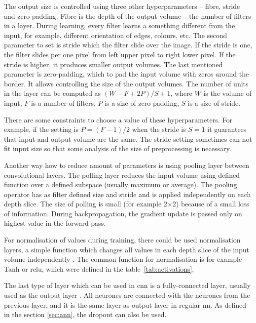 \documentclass[thesis=M,english]{FITthesis}[2012/10/20]
\begin{document}
The output size is controlled using three other hyperparameters -- fibre, stride and zero padding\cite{Johnson2017cnn}. Fibre is the depth of the output volume -- the number of filters in a layer. During learning, every filter learns a something different from the input, for example, different orientation of edges, colours, etc. The second parameter to set is stride which the filter slide over the image. If the stride is one, the filter slides per one pixel from left upper pixel to right lower pixel. If the stride is higher, it produces smaller output volumes. The last mentioned parameter is zero-padding, which to pad the input volume with zeros around the border. It allows controlling the size of the output volumes. The number of units in the layer can be computed as $(W-F+2P)/S+1$, where $W$ is the volume of input, $F$ is a number of filters, $P$ is a size of zero-padding, $S$ is a size of stride.

There are some constraints to choose a value of these hyperparameters. For example, if the setting is $P=(F-1)/2$ when the stride is $S=1$ it guarantees that input and output volume are the same. The stride setting sometimes can not fit input size so that some analysis of the size of preprocessing is necessary.

Another way how to reduce amount of parameters is using pooling layer between convolutional layers.\cite{Johnson2017cnn} The polling layer reduces the input volume using defined function over a defined subspace (usually maximum or average). The pooling operator has as filter defined size and stride and is applied independently on each depth slice. The size of polling is small (for example 2$\times$2) because of a small loss of information. During backpropagation, the gradient update is passed only on highest value in the forward pass.

For normalisation of values during training, there could be used normalisation layers, a simple function which changes all values in each depth slice of the input volume independently \cite{Johnson2017cnn}. The common function for normalisation is for example Tanh or \gls{relu}, which were defined in the table~\ref{tab:activations}.

The last type of layer which can be used in \gls{cnn} is a fully-connected layer, usually used as the output layer \cite{Johnson2017cnn}. All neurones are connected with the neurones from the previous layer, and it is the same layer as output layer in regular \gls{nn}. As defined in the section \ref{sec:ann}, the dropout can also be used.
\end{document}

